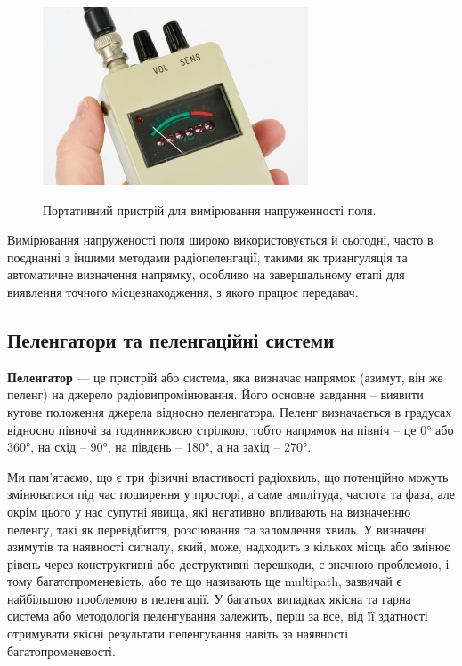 \documentclass{article}
\begin{document}
\begin{figure}[H]
 	\centering
 	{\includegraphics[width=0.6\linewidth]{images/rdf-small.jpg}}
 	\caption{\label{fig:rds:small}Портативний пристрій для вимірювання напруженності поля.}
\end{figure}
 
Вимірювання напруженості поля широко використовується й сьогодні, часто в поєднанні з іншими методами радіопеленгації, такими як триангуляція та автоматичне визначення напрямку, особливо на завершальному етапі для виявлення точного місцезнаходження, з якого працює передавач.

 
\subsection{Пеленгатори та пеленгаційні системи} 
\textbf{Пеленгатор} --- це пристрій або система, яка визначає напрямок (азимут, він же пеленг) на джерело радіовипромінювання. Його основне завдання -- виявити кутове положення джерела відносно пеленгатора. Пеленг визначається в градусах відносно півночі за годинниковою стрілкою, тобто напрямок на північ -- це 0° або 360°, на схід -- 90°, на південь -- 180°, а на захід -- 270°. 

Ми пам'ятаємо, що є три фізичні властивості радіохвиль, що потенційно можуть змінюватися під час поширення у просторі, а саме амплітуда, частота та фаза, але окрім цього у нас супутні явища, які негативно впливають на визначенню пеленгу, такі як перевідбиття, розсіювання та заломлення хвиль. У визначені азимутів та наявності сигналу, який, може, надходить з кількох місць або змінює рівень через конструктивні або деструктивні перешкоди, є значною проблемою, і тому багатопроменевість, або те що називають ще multipath, зазвичай є найбільшою проблемою в пеленгації. У багатьох випадках якісна та гарна система або методологія пеленгування залежить, перш за все, від її здатності отримувати якісні результати пеленгування навіть за наявності  багатопроменевості. 
\end{document}
